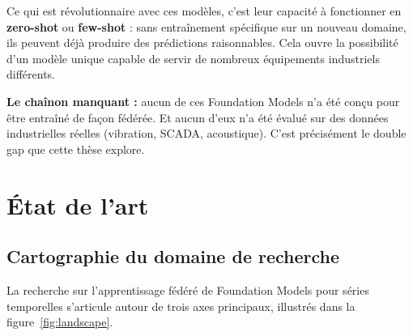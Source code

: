 \documentclass[12pt, a4paper]{report}
\begin{document}
Ce qui est révolutionnaire avec ces modèles, c'est leur capacité à fonctionner
en \textbf{zero-shot} ou \textbf{few-shot} : sans entraînement spécifique sur un
nouveau domaine, ils peuvent déjà produire des prédictions raisonnables. Cela ouvre
la possibilité d'un modèle unique capable de servir de nombreux équipements industriels
différents.

\begin{infobox}
\textbf{Le chaînon manquant :} aucun de ces Foundation Models n'a été conçu pour être
entraîné de façon fédérée. Et aucun d'eux n'a été évalué sur des données industrielles
réelles (vibration, SCADA, acoustique). C'est précisément le double gap que cette thèse explore.
\end{infobox}

\chapter{État de l'art}

\section{Cartographie du domaine de recherche}

La recherche sur l'apprentissage fédéré de Foundation Models pour séries temporelles
s'articule autour de trois axes principaux, illustrés dans la figure~\ref{fig:landscape}.
\end{document}
